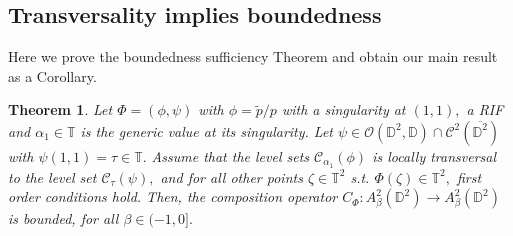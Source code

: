 \documentclass[12pt]{amsart}
\newtheorem{theorem}{Theorem}[section]
\numberwithin{equation}{section}
\begin{document}
\subsection{Transversality implies boundedness}\label{transversal} 
Here we prove the boundedness sufficiency Theorem and obtain our main result as a Corollary.
\begin{theorem} Let $\Phi=(\phi,\psi)$ with $\phi=\widetilde{p}/p$ with a singularity at $(1,1),$ a RIF and $\alpha_1\in\mathbb{T}$ is the generic value at its singularity. Let $\psi\in\mathcal{O}(\mathbb{D}^2,\mathbb{D})\cap \mathcal{C}^2(\overline{\mathbb{D}^2})$ with $\psi(1,1)=\tau\in\mathbb{T}.$ Assume that the level sets $\mathcal{C}_{\alpha_1}(\phi)$ is locally transversal to the level set $\mathcal{C}_{\tau}(\psi),$ and for all other points $\zeta\in\mathbb{T}^2$ s.t. $\Phi(\zeta)\in\mathbb{T}^2,$ first order conditions hold.  Then, the composition operator $C_{\Phi}:A^2_{\beta}(\mathbb{D}^2)\to A^2_{\beta}(\mathbb{D}^2)$ is bounded, for all $\beta\in(-1,0].$
\end{theorem}
\end{document}
